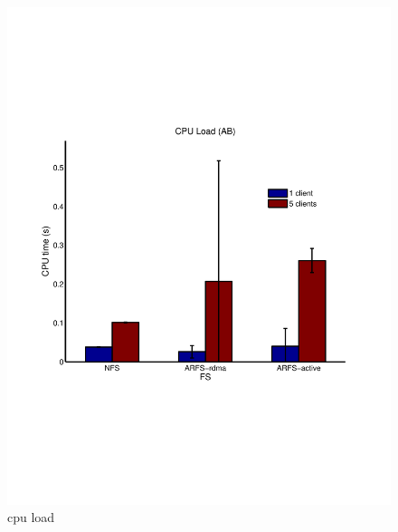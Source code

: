 \documentclass[10pt]{article}
\begin{document}
\begin{figure}
  \centering
\includegraphics[scale=0.5, trim = 0 200 0 200]{../../results/matlab/cpuload.pdf}
  \caption{cpu load}\label{cpuload}
\end{figure}
\end{document}
